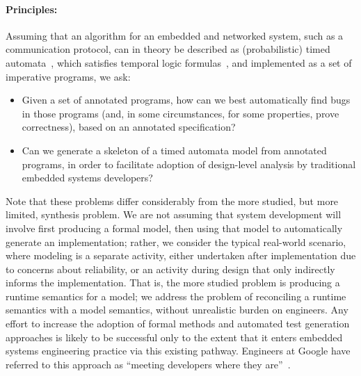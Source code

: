 \paragraph{Principles:} Assuming that an algorithm for an embedded and
networked system, such as a communication protocol, can in theory be
described as (probabilistic) timed automata~\cite{AD1994:TCS}, which
satisfies temporal logic formulas~\cite{BLM2017:LNCS}, and implemented
as a set of imperative programs, we ask:
\begin{itemize}[labelsep=3pt,leftmargin=12pt]
\item Given a set of annotated programs, how can we best automatically
  find bugs in those programs (and, in some circumstances, for some
  properties, prove correctness), based on an annotated
  specification?
\item Can we generate a skeleton of a timed automata model from 
  annotated programs, in order to facilitate adoption of design-level analysis by 
  traditional embedded systems developers? 
\end{itemize}

Note that these problems differ considerably from the more studied,
but more limited, synthesis problem.  We are not assuming that
system development will involve first producing a formal model, then
using that model to automatically generate an implementation; rather,
we consider the typical real-world scenario, where modeling is a
separate activity, either undertaken after implementation due to
concerns about reliability, or an activity during design that only
indirectly informs the implementation.  That is, the more studied
problem is producing a runtime semantics for a model; we address the
problem of reconciling a runtime semantics with a model semantics,
without unrealistic burden on engineers.   Any
effort to increase the
adoption of formal methods and automated test generation
approaches is likely to be successful only to the extent that it enters
embedded systems engineering practice via this existing pathway.  Engineers at Google have referred to this
approach as ``meeting developers where they are''~\cite{meeting}.


